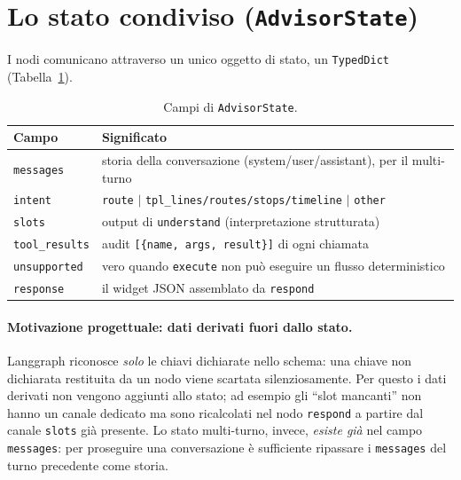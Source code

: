\documentclass[11pt,a4paper]{article}
\begin{document}
\section{Lo stato condiviso (\texttt{AdvisorState})}
I nodi comunicano attraverso un unico oggetto di stato, un \texttt{TypedDict}
(Tabella~\ref{tab:state}).

\begin{table}[h]
\centering
\begin{tabular}{ll}
\toprule
\textbf{Campo} & \textbf{Significato} \\
\midrule
\texttt{messages}     & storia della conversazione (system/user/assistant), per il multi-turno \\
\texttt{intent}       & \texttt{route} $\mid$ \texttt{tpl\_lines/routes/stops/timeline} $\mid$ \texttt{other} \\
\texttt{slots}        & output di \texttt{understand} (interpretazione strutturata) \\
\texttt{tool\_results} & audit \texttt{[\{name, args, result\}]} di ogni chiamata \\
\texttt{unsupported}  & vero quando \texttt{execute} non può eseguire un flusso deterministico \\
\texttt{response}     & il widget JSON assemblato da \texttt{respond} \\
\bottomrule
\end{tabular}
\caption{Campi di \texttt{AdvisorState}.}
\label{tab:state}
\end{table}

\paragraph{Motivazione progettuale: dati derivati fuori dallo stato.} Langgraph
riconosce \emph{solo} le chiavi dichiarate nello schema: una chiave non
dichiarata restituita da un nodo viene scartata silenziosamente. Per questo i
dati derivati non vengono aggiunti allo stato; ad esempio gli ``slot mancanti''
non hanno un canale dedicato ma sono ricalcolati nel nodo \texttt{respond} a
partire dal canale \texttt{slots} già presente. Lo stato multi-turno, invece,
\emph{esiste già} nel campo \texttt{messages}: per proseguire una conversazione
è sufficiente ripassare i \texttt{messages} del turno precedente come storia.

\end{document}

